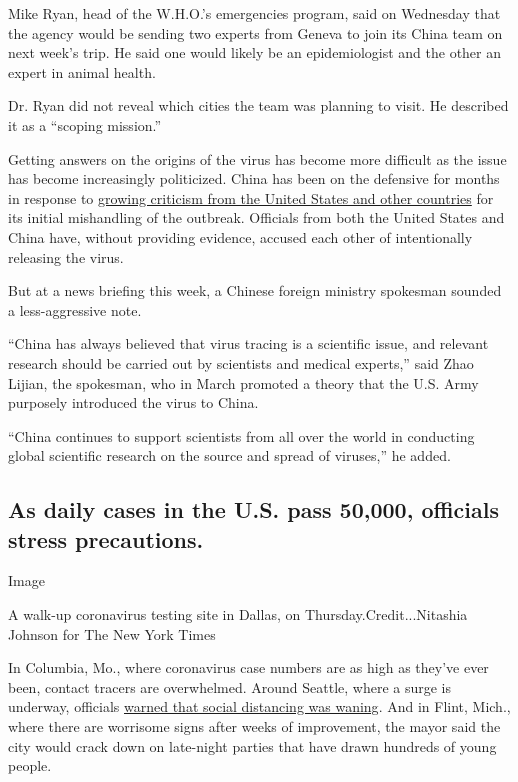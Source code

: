 Mike Ryan, head of the W.H.O.'s emergencies program, said on Wednesday
that the agency would be sending two experts from Geneva to join its
China team on next week's trip. He said one would likely be an
epidemiologist and the other an expert in animal health.

Dr. Ryan did not reveal which cities the team was planning to visit. He
described it as a ``scoping mission.''

Getting answers on the origins of the virus has become more difficult as
the issue has become increasingly politicized. China has been on the
defensive for months in response to
\href{https://www.nytimes3xbfgragh.onion/2020/05/03/world/europe/backlash-china-coronavirus.html}{growing
criticism from the United States and other countries} for its initial
mishandling of the outbreak. Officials from both the United States and
China have, without providing evidence, accused each other of
intentionally releasing the virus.

But at a news briefing this week, a Chinese foreign ministry spokesman
sounded a less-aggressive note.

``China has always believed that virus tracing is a scientific issue,
and relevant research should be carried out by scientists and medical
experts,'' said Zhao Lijian, the spokesman, who in March promoted a
theory that the U.S. Army purposely introduced the virus to China.

``China continues to support scientists from all over the world in
conducting global scientific research on the source and spread of
viruses,'' he added.

\hypertarget{as-daily-cases-in-the-us-pass-50000-officials-stress-precautions}{%
\subsection{As daily cases in the U.S. pass 50,000, officials stress
precautions.}\label{as-daily-cases-in-the-us-pass-50000-officials-stress-precautions}}

Image

A walk-up coronavirus testing site in Dallas, on
Thursday.Credit...Nitashia Johnson for The New York Times

In Columbia, Mo., where coronavirus case numbers are as high as they've
ever been, contact tracers are overwhelmed. Around Seattle, where a
surge is underway, officials
\href{https://publichealthinsider.com/2020/07/02/wear-your-mask-and-keep-your-distance-we-need-you-to-fight-the-surge-of-covid-19-in-king-county/}{warned
that social distancing was waning}. And in Flint, Mich., where there are
worrisome signs after weeks of improvement, the mayor said the city
would crack down on late-night parties that have drawn hundreds of young
people.

